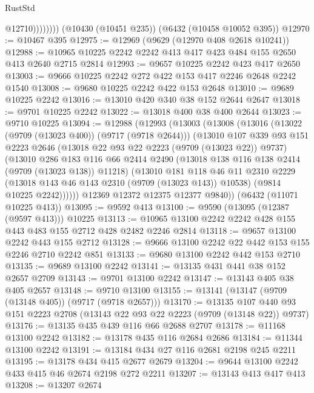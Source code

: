 \begin{lexlean}{RustStd}
\begin{coremodule}
                    @12710))))))))
    (@10430 (@10451 @235))
    (@6432 (@10458 @10052 @395))
@12970 := @10467 @395
@12975 := @12969 (@9629 (@12970 @408 @2618 @10241))
@12988 := @10965 @10225 @2242 @2242 @413 @417 @423 @484 @155 @2650 @413 @2640 @2715 @2814
@12993 := @9657 @10225 @2242 @423 @417 @2650
@13003 := @9666 @10225 @2242 @272 @422 @153 @417 @2246 @2648 @2242 @1540
@13008 := @9680 @10225 @2242 @422 @153 @2648
@13010 := @9689 @10225 @2242
@13016 := @13010 @420 @340 @38 @152 @2644 @2647
@13018 := @9701 @10225 @2242
@13022 := @13018 @400 @38 @400 @2644
@13023 := @9710 @10225
@13094 := @12988
    (@12993
      (@13003
        (@13008
          (@13016
            (@13022 (@9709 (@13023 @400)) (@9717 (@9718 @2644)))
            (@13010
              @107
              @339
              @93
              @151
              @2223
              @2646
              (@13018 @22 @93 @22 @2223 (@9709 (@13023 @22)) @9737)
              (@13010
                @286
                @183
                @116
                @66
                @2414
                @2490
                (@13018 @138 @116 @138 @2414 (@9709 (@13023 @138)) @11218)
                (@13010
                  @181
                  @118
                  @46
                  @11
                  @2310
                  @2229
                  (@13018 @143 @46 @143 @2310 (@9709 (@13023 @143)) @10538)
                  (@9814 @10225 @2242))))))
        @12369
        @12372
        @12375
        @12377
        @9840))
    (@6432 (@11071 @10225 @413))
@13095 := @9592 @413
@13100 := @9590 (@13095 (@12387 (@9597 @413))) @10225
@13113 := @10965 @13100 @2242 @2242 @428 @155 @443 @483 @155 @2712 @428 @2482 @2246 @2814
@13118 := @9657 @13100 @2242 @443 @155 @2712
@13128 := @9666 @13100 @2242 @22 @442 @153 @155 @2246 @2710 @2242 @851
@13133 := @9680 @13100 @2242 @442 @153 @2710
@13135 := @9689 @13100 @2242
@13141 := @13135 @431 @441 @38 @152 @2657 @2709
@13143 := @9701 @13100 @2242
@13147 := @13143 @405 @38 @405 @2657
@13148 := @9710 @13100
@13155 := @13141 (@13147 (@9709 (@13148 @405)) (@9717 (@9718 @2657)))
@13170 := @13135
    @107
    @440
    @93
    @151
    @2223
    @2708
    (@13143 @22 @93 @22 @2223 (@9709 (@13148 @22)) @9737)
@13176 := @13135 @435 @439 @116 @66 @2688 @2707
@13178 := @11168 @13100 @2242
@13182 := @13178 @435 @116 @2684 @2686
@13184 := @11344 @13100 @2242
@13191 := @13184 @434 @27 @116 @2681 @2198 @245 @2211
@13195 := @13178 @434 @415 @2677 @2679
@13204 := @9644 @13100 @2242 @433 @415 @46 @2674 @2198 @272 @2211
@13207 := @13143 @413 @417 @413
@13208 := @13207 @2674

\end{coremodule}
\end{lexlean}
